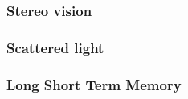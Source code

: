 \subsubsection{Stereo vision}

\subsubsection{Scattered light}

\subsubsection{Long Short Term Memory}



\subsection{}



